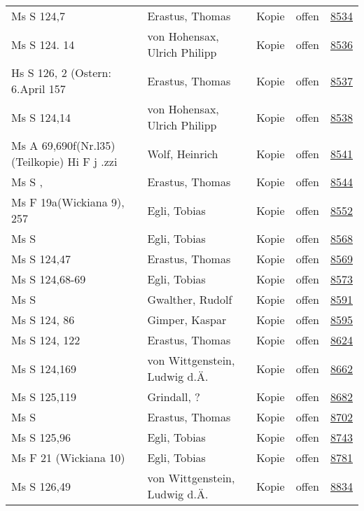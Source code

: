 \documentclass[10pt,a4paper,landscape]{report}
\begin{document}
\begin{longtable}{p{16cm}p{4cm}llr}
Ms S 124,7	&	Erastus, Thomas	&	Kopie	&	offen	&	\href{http://130.60.24.72/assignment/8534}{8534}\\
Ms S 124. 14	&	von Hohensax, Ulrich Philipp	&	Kopie	&	offen	&	\href{http://130.60.24.72/assignment/8536}{8536}\\
Hs S 126, 2 (Ostern: 6.April 157	&	Erastus, Thomas	&	Kopie	&	offen	&	\href{http://130.60.24.72/assignment/8537}{8537}\\
Ms S 124,14	&	von Hohensax, Ulrich Philipp	&	Kopie	&	offen	&	\href{http://130.60.24.72/assignment/8538}{8538}\\
Ms A 69,690f(Nr.l35) (Teilkopie) Hi F j .zzi	&	Wolf, Heinrich	&	Kopie	&	offen	&	\href{http://130.60.24.72/assignment/8541}{8541}\\
Ms S ,	&	Erastus, Thomas	&	Kopie	&	offen	&	\href{http://130.60.24.72/assignment/8544}{8544}\\
Ms F 19a(Wickiana 9), 257	&	Egli, Tobias	&	Kopie	&	offen	&	\href{http://130.60.24.72/assignment/8552}{8552}\\
Ms S	&	Egli, Tobias	&	Kopie	&	offen	&	\href{http://130.60.24.72/assignment/8568}{8568}\\
Ms S 124,47	&	Erastus, Thomas	&	Kopie	&	offen	&	\href{http://130.60.24.72/assignment/8569}{8569}\\
Ms S 124,68-69	&	Egli, Tobias	&	Kopie	&	offen	&	\href{http://130.60.24.72/assignment/8573}{8573}\\
Ms S	&	Gwalther, Rudolf	&	Kopie	&	offen	&	\href{http://130.60.24.72/assignment/8591}{8591}\\
Ms S 124, 86	&	Gimper, Kaspar	&	Kopie	&	offen	&	\href{http://130.60.24.72/assignment/8595}{8595}\\
Ms S 124, 122	&	Erastus, Thomas	&	Kopie	&	offen	&	\href{http://130.60.24.72/assignment/8624}{8624}\\
Ms S 124,169	&	von Wittgenstein, Ludwig d.Ä.	&	Kopie	&	offen	&	\href{http://130.60.24.72/assignment/8662}{8662}\\
Ms S 125,119	&	Grindall, ?	&	Kopie	&	offen	&	\href{http://130.60.24.72/assignment/8682}{8682}\\
Ms S	&	Erastus, Thomas	&	Kopie	&	offen	&	\href{http://130.60.24.72/assignment/8702}{8702}\\
Ms S 125,96	&	Egli, Tobias	&	Kopie	&	offen	&	\href{http://130.60.24.72/assignment/8743}{8743}\\
Ms F 21 (Wickiana 10)	&	Egli, Tobias	&	Kopie	&	offen	&	\href{http://130.60.24.72/assignment/8781}{8781}\\
Ms S 126,49	&	von Wittgenstein, Ludwig d.Ä.	&	Kopie	&	offen	&	\href{http://130.60.24.72/assignment/8834}{8834}\\

\end{longtable}
\end{document}
